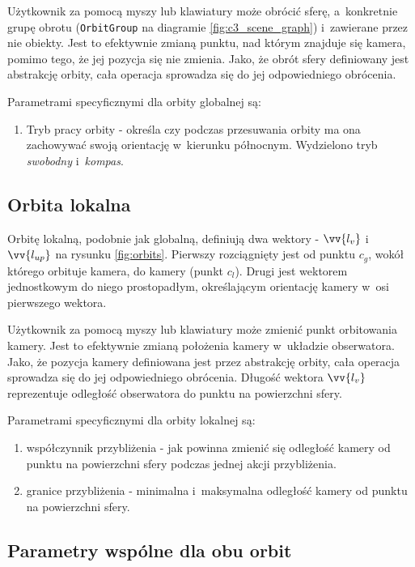 Użytkownik za pomocą myszy lub klawiatury może obrócić sferę, a~konkretnie grupę obrotu (\texttt{OrbitGroup} na diagramie \ref{fig:c3_scene_graph}) i~zawierane przez nie obiekty. Jest to efektywnie zmianą punktu, nad którym znajduje się kamera, pomimo tego, że jej pozycja się nie zmienia. Jako, że obrót sfery definiowany jest abstrakcję orbity, cała operacja sprowadza się do jej odpowiedniego obrócenia. 
\begin{samepage}
Parametrami specyficznymi dla orbity globalnej są:
\begin{enumerate}
    \item Tryb pracy orbity - określa czy podczas przesuwania orbity ma ona zachowywać swoją orientację w~kierunku północnym. Wydzielono tryb \textit{swobodny} i~\textit{kompas}.
\end{enumerate}
\end{samepage}
\subsection{Orbita lokalna}

Orbitę lokalną, podobnie jak globalną, definiują dwa wektory - $\vv{l_v}$ i~$\vv{l_{up}}$ na rysunku \ref{fig:orbits}. Pierwszy rozciągnięty jest od punktu $c_g$, wokół którego orbituje kamera, do kamery (punkt $c_l$). Drugi jest wektorem jednostkowym do niego prostopadłym, określającym orientację kamery w~osi pierwszego wektora.

Użytkownik za pomocą myszy lub klawiatury może zmienić punkt orbitowania kamery. Jest to efektywnie zmianą położenia kamery w~układzie obserwatora. Jako, że pozycja kamery definiowana jest przez abstrakcję orbity, cała operacja sprowadza się do jej odpowiedniego obrócenia. Długość wektora $\vv{l_v}$ reprezentuje odległość obserwatora do punktu na powierzchni sfery. 

Parametrami specyficznymi dla orbity lokalnej są:
\begin{enumerate}
    \item współczynnik przybliżenia - jak powinna zmienić się odległość kamery od punktu na powierzchni sfery podczas jednej akcji przybliżenia.
    \item granice przybliżenia - minimalna i~maksymalna odległość kamery od punktu na powierzchni sfery.
\end{enumerate}

\subsection{Parametry wspólne dla obu orbit}

